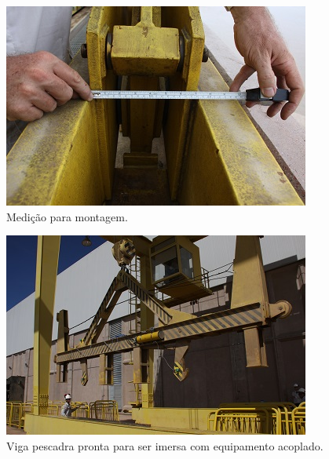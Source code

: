 \begin{figure}[h!]
  \centering
  \includegraphics[width=1\linewidth]{Fotos/Janeiro2015/9.jpg}
  \caption{Medição para montagem.}
  \label{nov20132}
\end{figure}

\begin{figure}[h!]
  \centering
  \includegraphics[width=1\linewidth]{Fotos/Janeiro2015/13.jpg}
  \caption{Viga pescadra pronta para ser imersa com equipamento acoplado.}
  \label{nov20133}
\end{figure}

